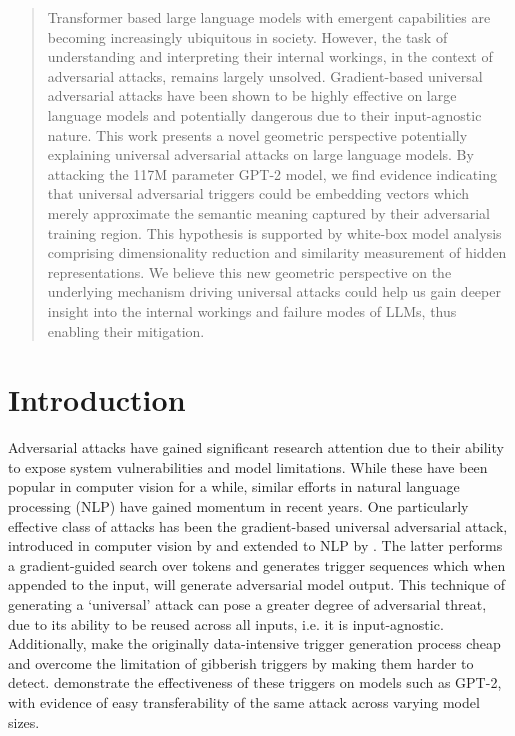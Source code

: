 \documentclass{article}
\theoremstyle{plain}
\theoremstyle{definition}
\theoremstyle{remark}
\begin{document}
\printAffiliationsAndNotice{\icmlEqualContribution} %

\begin{abstract}
Transformer based large language models with emergent capabilities are becoming increasingly ubiquitous in society. However, the task of understanding and interpreting their internal workings, in the context of adversarial attacks, remains largely unsolved. Gradient-based universal adversarial attacks have been shown to be highly effective on large language models and potentially dangerous due to their input-agnostic nature. This work presents a novel geometric perspective potentially explaining universal adversarial attacks on large language models. By attacking the 117M parameter GPT-2 model, we find evidence indicating that universal adversarial triggers could be embedding vectors which merely approximate the semantic meaning captured by their adversarial training region. This hypothesis is supported by white-box model analysis comprising dimensionality reduction and similarity measurement of hidden representations. We believe this new geometric perspective on the underlying mechanism driving universal attacks could help us gain deeper insight into the internal workings and failure modes of LLMs, thus enabling their mitigation.
\end{abstract}

\section{Introduction} \label{introduction}

Adversarial attacks have gained significant research attention due to their ability to expose system vulnerabilities and model limitations. While these have been popular in computer vision for a while, similar efforts in natural language processing (NLP) have gained momentum in recent years. One particularly effective class of attacks has been the gradient-based universal adversarial attack, introduced in computer vision by \cite{Moosavi-Dezfooli16} and extended to NLP by \cite{Wallace2019}. The latter performs a gradient-guided search over tokens and generates trigger sequences which when appended to the input, will generate adversarial model output. This technique of generating a `universal’ attack can pose a greater degree of adversarial threat, due to its ability to be reused across all inputs, i.e. it is input-agnostic. Additionally, \cite{Singla2022MINIMALMM} make the originally data-intensive trigger generation process cheap and \cite{Song2021UniversalAA} overcome the limitation of gibberish triggers by making them harder to detect. \cite{Wallace2019} demonstrate the effectiveness of these triggers on models such as GPT-2, with evidence of easy transferability of the same attack across varying model sizes.
\end{document}
